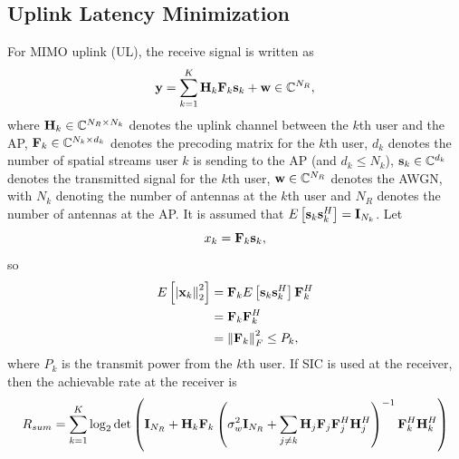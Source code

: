 \documentclass[a4paper, 12pt, onecolumn, journal, twoside, draftclsnofoot]{IEEEtran}
\begin{document}
\subsection{Uplink Latency Minimization}
For MIMO uplink (UL), the receive signal is written as
\begin{equation*}
	{\bf y} = \sum_{k=1}^K  {\bf H}_k {\bf F}_k {\bf s}_k + {\bf w} \in \mathbb{C}^{N_R},
\end{equation*}
where 
${\bf H}_k \in \mathbb{C}^{N_R \times N_k}$ denotes the uplink channel between the $k$th user and the AP, ${\bf F}_k \in \mathbb{C}^{N_k \times d_k}$ denotes the precoding matrix for the $k$th user, $d_k$ denotes the number of spatial streams user $k$ is sending to the AP (and $d_k \leq N_k$), ${\bf s}_k \in \mathbb{C}^{d_k}$ denotes the transmitted signal for the $k$th user, ${\bf w} \in \mathbb{C}^{N_R}$  denotes the AWGN, with $N_k$ denoting the number of antennas at the $k$th user and $N_R$ denotes the number of antennas at the AP.  It is assumed that $E \left[ {\bf s}_k {\bf s}_k^H \right] = {\bf I}_{N_k}$.  Let 
\begin{equation*}
	x_k = {\bf F}_k {\bf s}_k,
\end{equation*}
so
\begin{align*}
	E \left[ \left| {\bf x}_k \right\|_2^2 \right] &= {\bf F}_k E \left[ {\bf s}_k {\bf s}_k^H \right] {\bf F}_k^H \\
	&= {\bf F}_k {\bf F}_k^H  \\
	&=  \left\| {\bf F}_k \right\|_F^2  \leq P_k,
\end{align*}
where $P_k$ is the transmit power from the $k$th user.  If SIC is used at the receiver, then the achievable rate at the receiver is
\begin{equation*}
	R_{sum} = \sum_{k=1}^K  \log_2 \det \left(  {\bf I}_{N_R}  +  {\bf H}_k {\bf F}_k     \left(  \sigma_w^2 {\bf I}_{N_R}  + \sum_{j \neq k}  {\bf H}_j {\bf F}_j {\bf F}_j^H {\bf H}_j^H  \right)^{-1}     {\bf F}_k^H {\bf H}_k^H  \right) 
\end{equation*}
\end{document}

